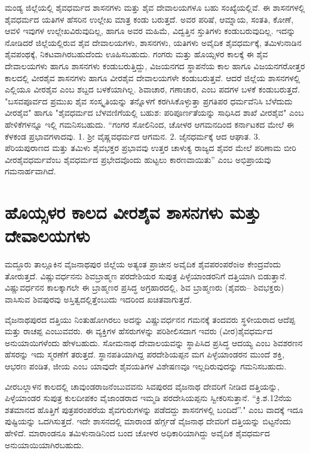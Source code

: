 ಮಂಡ್ಯ ಜಿಲ್ಲೆಯಲ್ಲಿ ಶೈವಧರ್ಮದ ಶಾಸನಗಳು ಮತ್ತು ಶೈವ ದೇವಾಲಯಗಳೂ ಬಹು ಸಂಖ್ಯೆಯಲ್ಲಿವೆ. ಈ ಶಾಸನಗಳಲ್ಲಿ ಶೈವಧರ್ಮದ ಯತಿಗಳ ಹೆಸರಿನ ಉಲ್ಲೇಖ ಮಾತ್ರ ಕಂಡು ಬರುತ್ತದೆ. ಅವರ ಪರಿಷೆ, ಆಮ್ನಾಯ, ಸಂತತಿ, ಕೋಣೆ, ಆವಳಿ ಇವುಗಳ ಉಲ್ಲೇಖವಿರುವುದಿಲ್ಲ, ಹಾಗೂ ಅವರ ಮಹಿಮೆ, ವಿದ್ವತ್ತಿನ ಸ್ತುತಿಗಳು ಕಂಡುಬರುವುದಿಲ್ಲ. ಇದನ್ನು ನೋಡಿದರೆ ಜಿಲ್ಲೆಯಲ್ಲಿರುವ ಶೈವ ದೇವಾಲಯಗಳು, ಶಾಸನಗಳು, ಯತಿಗಳು ಅವೈದಿಕ ಶೈವಧರ್ಮಕ್ಕೆ, ತಮಿಳುನಾಡಿನ ಶೈವಪಂಥಕ್ಕೆ, ನಿಕಟವಾಗಿರಬಹುದೆಂದು ಊಹಿಸಬಹುದು. ಗಂಗರು ಮತ್ತು ಹೊಯ್ಸಳರ ಕಾಲಕ್ಕೆ ಈ ಶೈವ ದೇವಾಲಯಗಳು ಹಾಗೂ ಶಾಸನಗಳು ಕಂಡುಬರುತ್ತಿದ್ದು, ವಿಜಯನಗದ ಸ್ಥಾಪನೆಯ ಕಾಲ ಹಾಗೂ ವಿಜಯನಗರೋತ್ತರ ಕಾಲದಲ್ಲಿ ವೀರಶೈವ ಶಾಸನಗಳು ಹಾಗೂ ವೀರಶೈವ ದೇವಾಲಯಗಳೇ ಕಂಡುಬರುತ್ತವೆ. ಆದರೆ ಜಿಲ್ಲೆಯ ಶಾಸನಗಳಲ್ಲಿ ಎಲ್ಲಿಯೂ ವೀರಶೈವ ಎಂಬ ಶಬ್ದದ ಬಳಕೆಯಾಗಿಲ್ಲ. ಶಿವಾಚಾರ, ಗಣಾಚಾರ, ಎಂಬ ಪದಗಳ ಬಳಕೆ ಕಂಡುಬರುತ್ತದೆ. "ಬಸವಪೂರ್ವದ ಪ್ರಮುಖ ಶೈವ ಸಂಸ್ಕೃತಿಯನ್ನು ತನ್ನೊಳಗೆ ಕರಗಿಸಿಕೊಳ್ಳುತ್ತಾ ಪ್ರಗತಿಪರ ಧರ್ಮವೆನಿಸಿ ಬೆಳೆದುದು ವೀರಶೈವ" ಹಾಗೂ "ಶೈವಧರ್ಮದ ಬೆಳವಣಿಗೆಯಲ್ಲಿ ಬಹುಶ: ಪರಿಪೂರ್ಣತೆಯನ್ನು ಸಾಧಿಸಿದ ಶಾಖೆ ವೀರಶೈವ" ಎಂಬ ಹೇಳಿಕೆಗಳನ್ನೂ ಇಲ್ಲಿ ಗಮನಿಸಬಹುದು. “ಗಂಗರ ಸೋಲಿನಿಂದ, ಚೋಳರ ಆಗಮನದಿಂದ ಕರ್ನಾಟಕದ ಮೇಲೆ ಈ ಕೆಳಕಂಡ ಪ್ರಭಾವಗಳಾದವು. 1. ಶ‍್ರೀ ವೈಷ್ಣವಧರ್ಮದ ಆಗಮನ. 2. ಜೈನಧರ್ಮಕ್ಕೆ ಆದ ಆಘಾತ. 3. ಪೆರಿಯಪುರಾಣದ ಮತ್ತು ತಮಿಳು ಶೈವಭಕ್ತರ ಪ್ರಭಾವವು ಉತ್ತರ ಚಾಳುಕ್ಯ ರಾಜ್ಯದ ಶೈವರ ಮೇಲೆ ಪರಿಣಾಮ ಬೀರಿ ವೀರಶೈವಧರ್ಮವೆಂಬ ಶೈವಧರ್ಮದ ಪ್ರಭೇದವೊಂದು ಹುಟ್ಟಲು ಕಾರಣವಾಯಿತು” ಎಂಬ ಅಭಿಪ್ರಾಯವು ಗಮನಾರ್ಹವಾಗಿದೆ.


\section{ಹೊಯ್ಸಳರ ಕಾಲದ ವೀರಶೈವ ಶಾಸನಗಳು ಮತ್ತು ದೇವಾಲಯಗಳು}

ಮದ್ದೂರು ತಾಲ್ಲೂಕಿನ ವೈಜನಾಥಪುರ ಜಿಲ್ಲೆಯ ಅತ್ಯಂತ ಪ್ರಾಚೀನ ಅವೈದಿಕ ಶೈವಪರಂಪರೆಂiಅ ಕೇಂದ್ರವೆಂದು ತೋರುತ್ತದೆ. ವಿಷ್ಣುವರ್ಧನನು ಶಿವಬ್ರಾಹ್ಮಣ ಪರದೇಶಿಯರ ಸುಪುತ್ರ ಪಿಳ್ಳೆಯಾಂಡರನಿಗೆ ದತ್ತಿಯಾಗಿ ಬಿಡುತ್ತಾನೆ. ವಿಷ್ಣುವರ್ಧನನ ಕಾಲಕ್ಕಾಗಲೇ ಈ ಬ್ರಾಹ್ಮಣರ ಪ್ರಸಿದ್ಧ ಅಗ್ರಹಾರದಲ್ಲಿ, ಶಿವ ಬ್ರಾಹ್ಮಣರು (ಶೈವರು– ಶಿವಭಕ್ತರು) ವಾಸಿಸುವ ಶಿವಪುರವು ಅಸ್ತಿತ್ವದಲ್ಲಿತ್ತೆಂಬುದು ಇದರಿಂದ ಖಚಿತವಾಗುತ್ತದೆ.

ವೈಜನಾಥಪುರದ ದತ್ತಿಯು ನಿಂತುಹೋಗಿರಲು ಅದನ್ನು ವಿಷ್ಣುವರ್ಧನನ ಗಮನಕ್ಕೆ ತಂದವರು ಸ್ಥಳೀಯರಾದ ಆದೆಪ್ಪ ಮತ್ತು ರಾಚಪ್ಪ ಎಂಬುವವರು. ಈ ವ್ಯಕ್ತಿಗಳ ಹೆಸರುಗಳನ್ನು ಪರಿಶೀಲಿಸದಾಗ ಇವರು (ವೀರ)ಶೈವಧರ್ಮದ ಅನುಯಾಯಿಗಳೆಂದು ಹೇಳಬಹುದು. ಸೋಮನಾಥ ದೇವಾಲಯವನ್ನು ಸ್ಥಾಪಿಸಿದ ಪ್ರಸಿದ್ಧ ಆದಯ್ಯ ಎಂಬ ಶಿವಶರಣನ ಹೆಸರನ್ನು ಇದು ಸ್ಮರಣೆಗೆ ತರುತ್ತದೆ. ಸ್ಥಾನಪತಿಯಾಗಿದ್ದ ಪರದೇಶಿಯಪ್ಪನ ಮಗ ಪಿಳ್ಳೆಯಾಂಡರನ ಮುಂದೆ ಶಕ್ತಿ, ಆಭರಣ ಪಂಡಿತ, ಜೀಯ ಎಂಬ ಯಾವುದೇ ಶೈವಯತಿಗಳ ವಿಶೇಷಣವೂ ಇಲ್ಲದಿರುವುದನ್ನು ಗಮನಿಸಬಹುದು.

ವೀರಬಲ್ಲಾಳನ ಕಾಲದಲ್ಲಿ ಚಾವುಂಡರಾಜನೆಂಬುವವನು ಸಿವಪುರದ ವೈಜನಾಥ ದೇವರಿಗೆ ನೀಡಿದ ದತ್ತಿಯನ್ನು, ಪಿಳ್ಳೆಯಾಂಡರ ಸುಪುತ್ರ ಕುಲದೀಪಕಂ ವೈಜಾಂಡರಾದ ಇಮ್ಮಡಿ ಪರದೇಸಿಯಪ್ಪನು ಸ್ವೀಕರಿಸುತ್ತಾನೆ. “ಕ್ರಿ.ಶ.12ನೆಯ ಶತಮಾನದ ಹೊತ್ತಿಗೆ ಪುತ್ರಪರಂಪರೆಯ ಶೈವಗುರುಗಳನ್ನು ಪಡೆದದ್ದು ಶಾಸನಗಳಲ್ಲಿ ಬಂದಿದೆ”." ಎಂಬ ವಾದಕ್ಕೆ ಇದೂ ಪುಷ್ಟಿಯನ್ನು ಒದಗಿಸುತ್ತದೆ. ಇದೇ ಶಾಸನದಲ್ಲಿ ಮಾರಾಂಡ ಹೆರ್ಗ್ಗಡೆ ವೈಜನಾಥ ದೇವರಿಗೆ ದತ್ತಿಯನ್ನು ಬಿಟ್ಟನೆಂದು ಹೇಳಿದೆ. ಮಾರಾಂಡನೂ ತಮಿಳುನಾಡಿನಿಂದ ಬಂದ ಚೋಳರ ಅಧಿಕಾರಿಯಾಗಿದ್ದು ಅವೈದಿಕ ಶೈವಧರ್ಮದ ಅನುಯಾಯಿಯಾಗಿರಬಹುದು.


